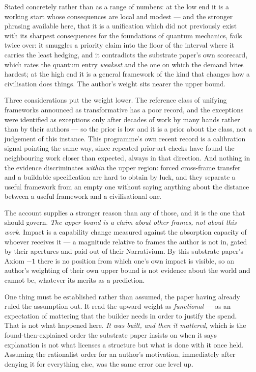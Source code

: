 \documentclass[11pt,a4paper]{article}
\theoremstyle{remark}\newtheorem{remark}[definition]{Remark}
\begin{document}
Stated concretely rather than as a range of numbers: at the low end it is a working start whose consequences are
local and modest --- and the stronger phrasing available here, that it is a unification which did not previously exist with its sharpest consequences for the foundations of quantum mechanics, fails twice over: it smuggles a priority claim into the floor of the interval where it carries the
least hedging, and it contradicts the substrate paper's own scorecard, which rates the quantum entry
\emph{weakest} and the one on which the demand bites hardest; at the high end it is a
general framework of the kind that changes how a civilisation does things. The author's weight sits
nearer the upper bound.


Three considerations put the weight lower. The reference class of unifying frameworks announced as
transformative has a poor record, and the exceptions were identified as exceptions only after decades
of work by many hands rather than by their authors --- so the prior is low and it is a prior about the
class, not a judgement of this instance. This programme's own recent record is a calibration signal
pointing the same way, since repeated prior-art checks have found the neighbouring work closer than
expected, always in that direction. And nothing in the evidence discriminates \emph{within} the upper
region: forced cross-frame transfer and a buildable specification are hard to obtain by luck, and they
separate a useful framework from an empty one without saying anything about the distance between a
useful framework and a civilisational one.

The account supplies a stronger reason than any of those, and it is the one that should govern.
\emph{The upper bound is a claim about other frames, not about this work.} Impact is a capability
change measured against the absorption capacity of whoever receives it --- a magnitude relative to
frames the author is not in, gated by their apertures and paid out of their Narrativium. By this
substrate paper's Axiom $-1$ there is no position from which one's own impact is visible, so an author's weighting
of their own upper bound is not evidence about the world and cannot be, whatever its merits as a
prediction.

One thing must be established rather than assumed, the paper having already ruled the assumption out. It read the upward weight as
\emph{functional} --- as an expectation of mattering that the builder needs in order to justify the
spend. That is not what happened here. \emph{It was built, and then it mattered}, which is the
found-then-explained order the substrate paper insists on when it says explanation is not what licenses
a structure but what is done with it once held. Assuming the rationalist order for an author's
motivation, immediately after denying it for everything else, was the same error one level up.
\end{document}
